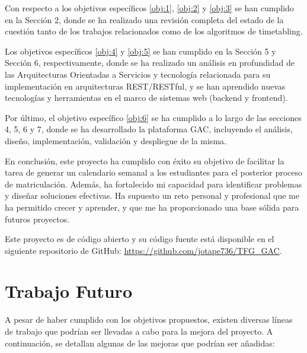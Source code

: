 Con respecto a los objetivos específicos \ref{obj:1}, \ref{obj:2} y \ref{obj:3} se han cumplido en la Sección 2, donde se ha realizado una revisión completa del estado de la cuestión tanto de los trabajos relacionados como de los algoritmos de timetabling.\newline

Los objetivos específicos \ref{obj:4} y \ref{obj:5} se han cumplido en la Sección 5 y Sección 6, respectivamente, donde se ha realizado un análisis en profundidad de las Arquitecturas Orientadas a Servicios y tecnología relacionada para su implementación en arquitecturas REST/RESTful, y se han aprendido nuevas tecnologías y herramientas en el marco de sistemas web (backend y frontend).\newline

Por último, el objetivo específico \ref{obj:6} se ha cumplido a lo largo de las secciones 4, 5, 6 y 7, donde se ha desarrollado la plataforma GAC, incluyendo el análisis, diseño, implementación, validación y despliegue de la misma.\newline

En conclusión, este proyecto ha cumplido con éxito su objetivo de facilitar la tarea de generar un calendario semanal a los estudiantes para el posterior proceso de matriculación. Además, ha fortalecido mi capacidad para identificar problemas y diseñar soluciones efectivas. Ha supuesto un reto personal y profesional que me ha permitido crecer y aprender, y que me ha proporcionado una base sólida para futuros proyectos.\newline

Este proyecto es de código abierto y su código fuente está disponible en el siguiente repositorio de GitHub: \url{https://github.com/jotape736/TFG_GAC}.

\section{Trabajo Futuro}

A pesar de haber cumplido con los objetivos propuestos, existen diversas líneas de trabajo que podrían ser llevadas a cabo para la mejora del proyecto. A continuación, se detallan algunas de las mejoras que podrían ser añadidas:

